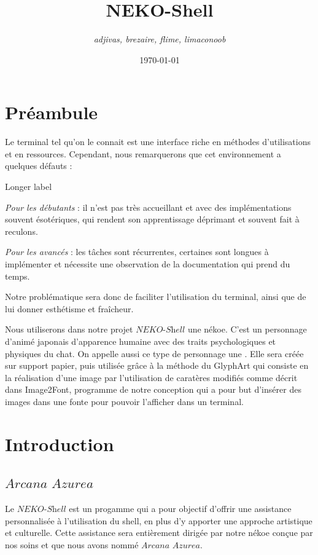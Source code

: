 \documentclass[titlepage]{article}
\title{\Huge{NEKO-Shell}}
\author{\textit{\Large{adjivas, brezaire, flime, limaconoob}}}
\date{\today}
\newcommand{\name}{\textit{Arcana Azurea}}
\newcommand{\program}{\textit{NEKO-Shell}}
\begin{document}
\maketitle

\newpage
\tableofcontents

\newpage
\section{Préambule}

Le terminal tel qu'on le connait est une interface riche en méthodes d'utilisations et en ressources. Cependant, nous remarquerons que cet environnement a quelques défauts :

\begin{labeling}{Longer label\quad}
	\item[\textit{Pour les débutants}]: il n'est pas très accueillant et avec des implémentations souvent ésotériques, qui rendent son apprentissage déprimant et souvent fait à reculons. 
	\item[\textit{Pour les avancés}]: les tâches sont récurrentes, certaines sont longues à implémenter et nécessite une observation de la documentation qui prend du temps.
\end{labeling}

Notre problématique sera donc de faciliter l'utilisation du terminal, ainsi que de lui donner esthétisme et fraîcheur.


Nous utiliserons dans notre projet $\program$ une nékoe. C'est un personnage d'animé japonais d'apparence humaine avec des traits psychologiques et physiques du chat. On appelle aussi ce type de personnage une
 \textendash.
Elle sera créée sur support papier, puis utilisée grâce à la méthode du GlyphArt qui consiste en la réalisation d'une image par l'utilisation de caratères modifiés comme décrit dans Image2Font, programme de notre conception qui a pour but d'insérer des images dans une fonte pour pouvoir l'afficher dans un terminal.

\newpage
\section{Introduction}

\subsection{$\name$}
Le $\program$ est un progamme qui a pour objectif d'offrir une assistance personnalisée à l'utilisation du shell, en plus d'y apporter une approche artistique et culturelle. Cette assistance sera entièrement dirigée par notre nékoe conçue par nos soins et que nous avons nommé $\name$.
\end{document}
